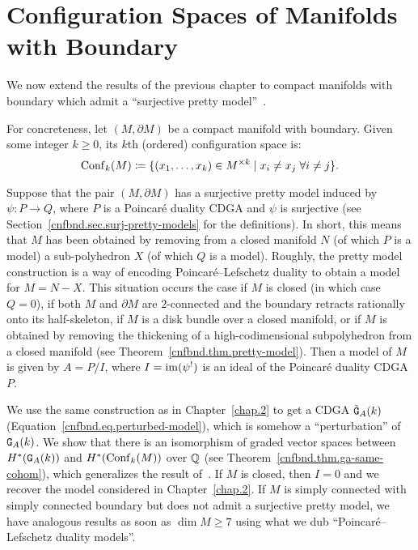 
\chapter{Configuration Spaces of Manifolds with Boundary}
\label{chap.3}

We now extend the results of the previous chapter to compact manifolds with boundary which admit a ``surjective pretty model''~\cite{CordovaBulensLambrechtsStanley2015}.

For concreteness, let $(M, \partial M)$ be a compact manifold with boundary.
Given some integer $k \ge 0$, its $k$th (ordered) configuration space is:
\[ \operatorname{Conf}_{k}(M) \coloneqq \{ (x_{1}, \dots, x_{k}) \in M^{\times k} \mid x_{i} \neq x_{j} \; \forall i \neq j \}. \]

Suppose that the pair $(M, \partial M)$ has a surjective pretty model induced by $\psi : P \to Q$, where $P$ is a Poincaré duality CDGA and $\psi$ is surjective (see Section~\ref{cnfbnd.sec.surj-pretty-models} for the definitions).
In short, this means that $M$ has been obtained by removing from a closed manifold $N$ (of which $P$ is a model) a sub-polyhedron $X$ (of which $Q$ is a model).
Roughly, the pretty model construction is a way of encoding Poincaré--Lefschetz duality to obtain a model for $M = N - X$.
This situation occurs the case if $M$ is closed (in which case $Q = 0$), if both $M$ and $\partial M$ are $2$-connected and the boundary retracts rationally onto its half-skeleton, if $M$ is a disk bundle over a closed manifold, or if $M$ is obtained by removing the thickening of a high-codimensional subpolyhedron from a closed manifold (see Theorem~\ref{cnfbnd.thm.pretty-model}).
Then a model of $M$ is given by $A = P/I$, where $I = \operatorname{im}(\psi^{!})$ is an ideal of the Poincaré duality CDGA $P$.

We use the same construction as in Chapter~\ref{chap.2} to get a CDGA $\tilde{\mathtt{G}}_{A}(k)$ (Equation~\eqref{cnfbnd.eq.perturbed-model}), which is somehow a ``perturbation'' of $\mathtt{G}_{A}(k)$.
We show that there is an isomorphism of graded vector spaces between $H^{*}(\mathtt{G}_{A}(k))$ and $H^{*}(\operatorname{Conf}_{k}(M))$ over $\mathbb{Q}$ (see Theorem~\ref{cnfbnd.thm.ga-same-cohom}), which generalizes the result of~\cite{LambrechtsStanley2008a}.
If $M$ is closed, then $I = 0$ and we recover the model considered in Chapter~\ref{chap.2}.
If $M$ is simply connected with simply connected boundary but does not admit a surjective pretty model, we have analogous results as soon as $\dim M \geq 7$ using what we dub ``Poincaré--Lefschetz duality models''.

